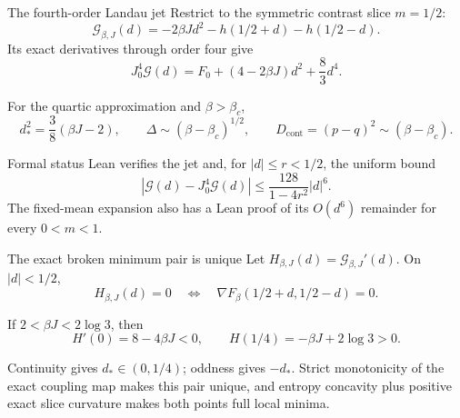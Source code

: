 \begin{frame}{The fourth-order Landau jet}
  \footnotesize
  Restrict to the symmetric contrast slice $m=1/2$:
  \[
    \mathcal G_{\beta,J}(d)
      =-2\beta Jd^2-h(1/2+d)-h(1/2-d).
  \]
  Its exact derivatives through order four give
  \[
    J_0^4\mathcal G(d)
      =F_0+(4-2\beta J)d^2+\frac{8}{3}d^4.
  \]

  For the quartic approximation and $\beta>\beta_c$,
  \[
    d_*^2=\frac{3}{8}(\beta J-2),
    \qquad
    \Delta\sim(\beta-\beta_c)^{1/2},
    \qquad
    D_{\mathrm{cont}}=(p-q)^2\sim(\beta-\beta_c).
  \]

  \begin{block}{Formal status}
    Lean verifies the jet and, for $|d|\le r<1/2$, the uniform bound
    \[
      |\mathcal G(d)-J_0^4\mathcal G(d)|
      \le \frac{128}{1-4r^2}|d|^6.
    \]
    The fixed-mean expansion also has a Lean proof of its $O(d^6)$ remainder
    for every $0<m<1$.
  \end{block}
\end{frame}

\begin{frame}{The exact broken minimum pair is unique}
  \small
  Let $H_{\beta,J}(d)=\mathcal G_{\beta,J}'(d)$.  On $|d|<1/2$,
  \[
    H_{\beta,J}(d)=0
    \quad\Longleftrightarrow\quad
    \nabla F_\beta(1/2+d,1/2-d)=0.
  \]

  If $2<\beta J<2\log 3$, then
  \[
    H'(0)=8-4\beta J<0,
    \qquad
    H(1/4)=-\beta J+2\log 3>0.
  \]

  \begin{center}
  \end{center}

  Continuity gives $d_*\in(0,1/4)$; oddness gives $-d_*$.  Strict monotonicity
  of the exact coupling map makes this pair unique, and entropy concavity plus
  positive exact slice curvature makes both points \alert{full local minima}.
\end{frame}

